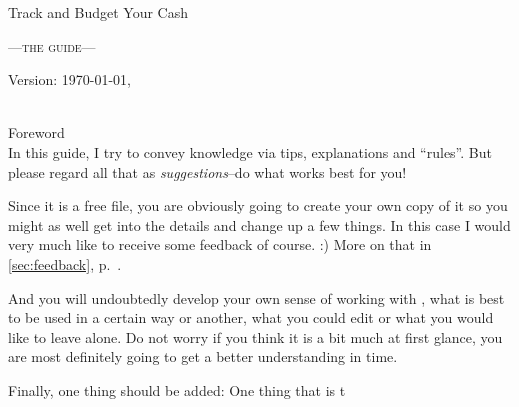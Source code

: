 
\begin{center}\LARGE
Track and Budget Your Cash
\end{center}
\begin{center}\scshape\large\sffamily
	---the guide---
\end{center}

\vfill
\begin{center}
Version: \today, \thistime
\end{center}

\clearpage
~\\
\vfill
{\sffamily\centering Foreword\\}
\small\singlespacing\rmfamily
In this guide, I try to convey knowledge via tips, explanations and ``rules''.
But please regard all that as \emph{suggestions}--do what works best for you!

Since it is a free file, you are obviously going to create your own copy of it so you might as well get into the details and change up a few things. In this case I would very much like to receive some feedback of course. :)
More on that in \autoref{sec:feedback}, p.~\pageref{sec:feedback}.

And you will undoubtedly develop your own sense of working with \tfn, what is best to be used in a certain way or another, what you could edit or what you would like to leave alone.
Do not worry if you think it is a bit much at first glance, you are most definitely going to get a better understanding in time.

Finally, one thing should be added: One thing that is t

